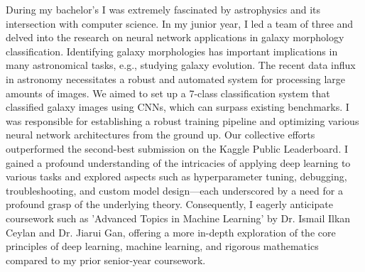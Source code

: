\documentclass{article}
\begin{document}
  \vspace{5pt}
\hspace{0.25in}During my bachelor’s I was extremely fascinated by astrophysics
and its intersection with computer science. In my junior year, I led a team of
three and delved into the research on neural network applications in galaxy
morphology classification. Identifying galaxy morphologies has important
implications in many astronomical tasks, e.g., studying galaxy evolution. The
recent data influx in astronomy necessitates a robust and automated system for
processing large amounts of images. We aimed to set up a 7-class classification
system that classified galaxy images using CNNs, which can surpass existing
benchmarks. I was responsible for establishing a robust training pipeline and
optimizing various neural network architectures from the ground up. Our
collective efforts outperformed the second-best submission on the Kaggle Public
Leaderboard. I gained a profound understanding of the intricacies of applying
deep learning to various tasks and explored aspects such as hyperparameter
tuning, debugging, troubleshooting, and custom model design—each underscored by
a need for a profound grasp of the underlying theory. Consequently, I eagerly
anticipate coursework such as 'Advanced Topics in Machine Learning' by Dr.
Ismail Ilkan Ceylan and Dr. Jiarui Gan, offering a more in-depth exploration of
the core principles of deep learning, machine learning, and rigorous mathematics
compared to my prior senior-year coursework.
\end{document}
